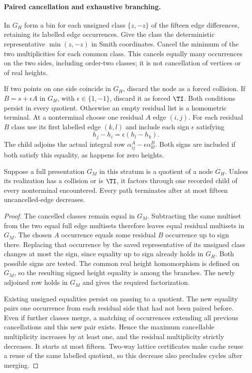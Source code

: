 \paragraph{Paired cancellation and exhaustive branching.}
In $G_H$ form a bin for each unsigned class $\{z,-z\}$ of the fifteen
edge differences, retaining its labelled edge occurrences. Give the
class the deterministic representative $\min(z,-z)$ in Smith coordinates.
Cancel the minimum of the two multiplicities for each common class.
This cancels equally many occurrences on the two sides, including
order-two classes; it is not cancellation of vertices or of real heights.

If two points on one side coincide in $G_H$, discard the node as a
forced collision. If $B=s+\epsilon A$ in $G_H$, with
$\epsilon\in\{1,-1\}$, discard it as forced $\TI$. Both conditions
persist in every quotient. Otherwise an empty residual list is a
homometric terminal. At a nonterminal choose one residual $A$ edge
$(i,j)$. For each residual $B$ class use its first labelled edge
$(k,l)$ and include each sign $\epsilon$ satisfying
\[
 h_j-h_i=\epsilon(h_l-h_k).
\]
The child adjoins the actual integral row
$\alpha_{ij}^A-\epsilon\alpha_{kl}^B$. Both signs are included if
both satisfy this equality, as happens for zero heights.

\begin{lemma}
Suppose a full presentation $G_M$ in this stratum is a quotient of a
node $G_H$. Unless its realization has a collision or is $\TI$,
it factors through one recorded child of every nonterminal encountered.
Every path terminates after at most fifteen uncancelled-edge decreases.
\end{lemma}
\begin{proof}
The cancelled classes remain equal in $G_M$. Subtracting the same
multiset from the two equal full edge multisets therefore leaves equal
residual multisets in $G_M$. The chosen $A$ occurrence equals some
residual $B$ occurrence up to sign there. Replacing that occurrence by
the saved representative of its unsigned class changes at most the
sign, since equality up to sign already holds in $G_H$. Both possible
signs are tested. The common real height homomorphism is defined on
$G_M$, so the resulting signed height equality is among the branches.
The newly adjoined row holds in $G_M$ and gives the required factorization.

Existing unsigned equalities persist on passing to a quotient. The new
equality pairs one occurrence from each residual side that had not been
paired before. Even if further classes merge, a matching of occurrences
extending all previous cancellations and this new pair exists. Hence the
maximum cancellable multiplicity increases by at least one, and the
residual multiplicity strictly decreases. It starts at most fifteen.
Two-way lattice certificates make cache reuse a reuse of the same
labelled quotient, so this decrease also precludes cycles after merging.
\end{proof}

